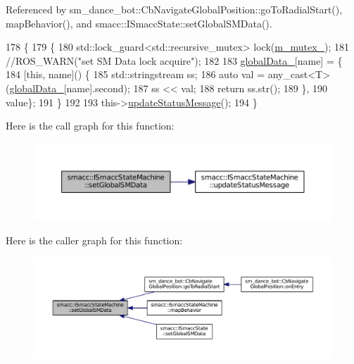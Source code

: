 Referenced by sm\+\_\+dance\+\_\+bot\+::\+Cb\+Navigate\+Global\+Position\+::go\+To\+Radial\+Start(), map\+Behavior(), and smacc\+::\+I\+Smacc\+State\+::set\+Global\+S\+M\+Data().


\begin{DoxyCode}
178 \{
179     \{
180         std::lock\_guard<std::recursive\_mutex> lock(\hyperlink{classsmacc_1_1ISmaccStateMachine_aac785541646e5c517273bf31072505a1}{m\_mutex\_});
181         \textcolor{comment}{//ROS\_WARN("set SM Data lock acquire");}
182 
183         \hyperlink{classsmacc_1_1ISmaccStateMachine_ad2f9dae184ea942db632ac4532a10a91}{globalData\_}[name] = \{
184             [\textcolor{keyword}{this}, name]() \{
185                 std::stringstream ss;
186                 \textcolor{keyword}{auto} val = any\_cast<T>(\hyperlink{classsmacc_1_1ISmaccStateMachine_ad2f9dae184ea942db632ac4532a10a91}{globalData\_}[name].second);
187                 ss << val;
188                 \textcolor{keywordflow}{return} ss.str();
189             \},
190             value\};
191     \}
192 
193     this->\hyperlink{classsmacc_1_1ISmaccStateMachine_ad246a49015fadaeb0b1639d7ab99f7d0}{updateStatusMessage}();
194 \}
\end{DoxyCode}


Here is the call graph for this function\+:
\nopagebreak
\begin{figure}[H]
\begin{center}
\leavevmode
\includegraphics[width=350pt]{classsmacc_1_1ISmaccStateMachine_a8588f9e580fbb95b53e2bd2ca3ff1f98_cgraph}
\end{center}
\end{figure}




Here is the caller graph for this function\+:
\nopagebreak
\begin{figure}[H]
\begin{center}
\leavevmode
\includegraphics[width=350pt]{classsmacc_1_1ISmaccStateMachine_a8588f9e580fbb95b53e2bd2ca3ff1f98_icgraph}
\end{center}
\end{figure}


